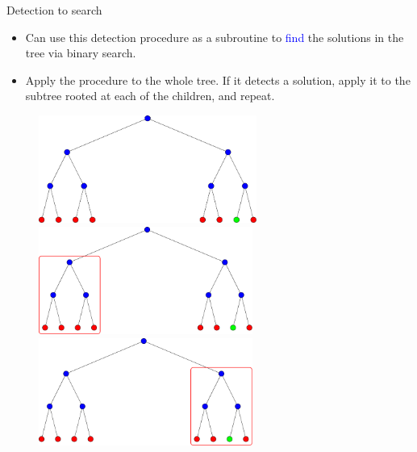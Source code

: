 \documentclass{beamer}
\begin{document}
\begin{frame}{Detection to search} \pause
\begin{itemize}
	\item Can use this detection procedure as a subroutine to \textcolor{blue}{find} the solutions in the tree via binary search. \pause
	\item Apply the procedure to the whole tree. \pause If it detects a solution, apply it to the subtree rooted at each of the children, and repeat. \pause 
\end{itemize}
\begin{figure}
	\centering
	\begin{overprint}
		\centering
		\includegraphics[height=100pt]{figures/search_tree1}
		\onslide<6>\centering
		\includegraphics[height=100pt]{figures/search_tree2}
		\onslide<7->\centering
		\includegraphics[height=100pt]{figures/search_tree3}
	\end{overprint}
\end{figure}
\end{frame}
\end{document}
